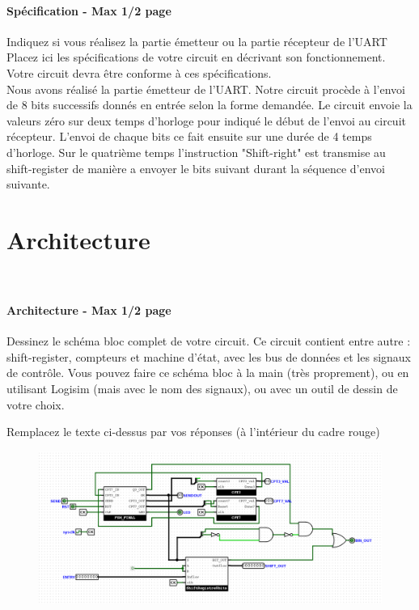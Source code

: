 \documentclass[a4paper]{article} %
\begin{document}


\begin{tcolorbox}[colframe=Monokaimagenta,colback=white]
\paragraph %
{Spécification - Max 1/2 page } 
Indiquez si vous réalisez la partie émetteur ou la partie récepteur de l’UART
Placez ici les spécifications de votre circuit en décrivant son fonctionnement. Votre circuit devra être conforme à ces spécifications.\\

Nous avons réalisé la partie émetteur de l'UART. Notre circuit procède à l'envoi de 8 bits successifs donnés en entrée selon la forme demandée. Le circuit envoie la valeurs zéro sur deux temps d'horloge pour indiqué le début de l'envoi au circuit récepteur. L'envoi de chaque bits ce fait ensuite sur une durée de 4 temps d'horloge. Sur le quatrième temps l'instruction "Shift-right" est transmise au shift-register de manière a envoyer le bits suivant durant la séquence d'envoi suivante.
\end{tcolorbox}

\section{Architecture}\

\begin{tcolorbox}[colframe=Monokaimagenta,colback=white]
\paragraph{Architecture - Max 1/2 page}
Dessinez le schéma bloc complet de votre circuit. Ce circuit contient entre autre : shift-register, compteurs et machine d’état, avec les bus de données et les signaux de contrôle. Vous pouvez faire ce schéma bloc à la main (très proprement), ou en utilisant Logisim (mais avec le nom des signaux), ou avec un outil de dessin de votre choix.

Remplacez le texte ci-dessus par vos réponses (à l’intérieur du cadre rouge)\\



\begin{figure}[H]
	\centering
	\includegraphics[width=\textwidth]{src/schema_UART}
	\label{fig:UART}
\end{figure}


\end{tcolorbox}
\end{document}
